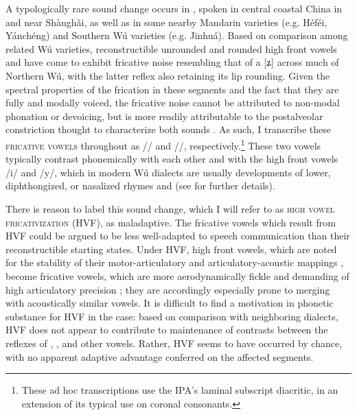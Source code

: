 \documentclass[output=paper,hidelinks]{langscibook}
\begin{document}
A typologically rare sound change occurs in , spoken in central coastal China in and near Sh\`{a}ngh\v{a}i, as well as in some nearby  Mandarin varieties (e.g. Héféi, Yánchéng) and Southern Wú varieties (e.g. Jīnhuá). Based on comparison among related Wú varieties, reconstructible unrounded and rounded high front vowels \pri{} and \pry{} have come to exhibit fricative noise resembling that of a [ʑ] across much of Northern Wú, with the latter reflex also retaining its lip rounding.
Given the spectral properties of the frication in these segments and the fact that they are fully and modally voiced, the fricative noise cannot be attributed to non-modal phonation or devoicing, but is more readily attributable to the postalveolar constriction thought to characterize both sounds \citep[43--50]{ling, ling-phd}.
%
As such, I transcribe these \textsc{fricative vowels} throughout as /\iz{}/ and /\yz{}/, respectively.\footnote{These ad hoc transcriptions use the IPA's laminal subscript diacritic, in an extension of its typical use on coronal consonants.}
%
These two vowels typically contrast phonemically with each other and with the high front vowels /i/ and /y/, which in modern Wú dialects are usually developments of lower, diphthongized, or nasalized rhymes \prien{} and \pryen{} (see  for further details).


There is reason to label this sound change, which I will refer to as \textsc{high vowel fricativization} (HVF), as maladaptive.
%
The fricative vowels which result from HVF could be argued to be less well-adapted to speech communication than their reconstructible starting states. Under HVF, high front vowels, which are noted for the stability of their motor-articulatory and articulatory-acoustic mappings \citep{fujimura-kakita, stevens-nature}, become fricative vowels, which are more aerodynamically fickle and demanding of high articulatory precision \citep{ohala83}; they are accordingly especially prone to merging with acoustically similar vowels.
%
It is difficult to find a motivation in phonetic substance for HVF in the \SC{} case: based on comparison with neighboring dialects, HVF does not appear to contribute to maintenance of contrasts between the reflexes of \pri{}, \pry{}, and other vowels.
%
Rather, HVF seems to have occurred by chance, with no apparent adaptive advantage conferred on the affected segments.
\end{document}
